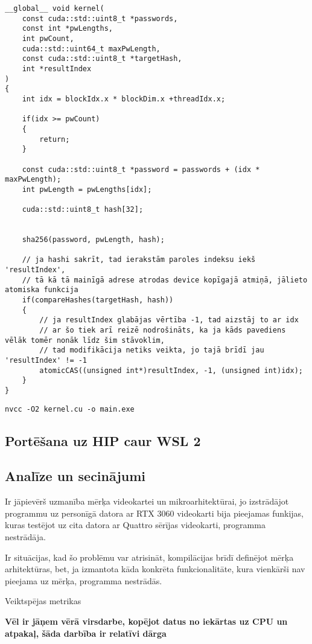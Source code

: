\documentclass[12pt]{report}%
\theoremstyle{definition}
\begin{document}
\begin{lstlisting}
__global__ void kernel(
    const cuda::std::uint8_t *passwords,
    const int *pwLengths,
    int pwCount,
    cuda::std::uint64_t maxPwLength,
    const cuda::std::uint8_t *targetHash,
    int *resultIndex
)
{
    int idx = blockIdx.x * blockDim.x +threadIdx.x;

    if(idx >= pwCount)
    {
        return;
    }

    const cuda::std::uint8_t *password = passwords + (idx * maxPwLength);
    int pwLength = pwLengths[idx];

    cuda::std::uint8_t hash[32];


    sha256(password, pwLength, hash);

    // ja hashi sakrīt, tad ierakstām paroles indeksu iekš 'resultIndex',
    // tā kā tā mainīgā adrese atrodas device kopīgajā atmiņā, jālieto atomiska funkcija
    if(compareHashes(targetHash, hash))
    {
        // ja resultIndex glabājas vērtība -1, tad aizstāj to ar idx
        // ar šo tiek arī reizē nodrošināts, ka ja kāds pavediens vēlāk tomēr nonāk līdz šim stāvoklim,
        // tad modifikācija netiks veikta, jo tajā brīdī jau 'resultIndex' != -1
        atomicCAS((unsigned int*)resultIndex, -1, (unsigned int)idx);
    }
}
\end{lstlisting}


\texttt{nvcc -O2 kernel.cu -o main.exe}

\subsection{Portēšana uz HIP caur WSL 2}

\subsection{Analīze un secinājumi}

Ir jāpievērš uzmanība mērķa videokartei un mikroarhitektūrai, jo izstrādājot programmu uz personīgā datora 
ar RTX 3060 videokarti bija pieejamas funkijas, kuras testējot uz cita datora ar Quattro sērījas videokarti,
programma nestrādāja.

Ir situācijas, kad šo problēmu var atrisināt, kompilācijas brīdī definējot mērķa arhitektūras, bet,
ja izmantota kāda konkrēta funkcionalitāte, kura vienkārši nav pieejama uz mērķa, programma nestrādās.


Veiktspējas metrikas

\textbf{Vēl ir jāņem vērā virsdarbe, kopējot datus no iekārtas uz CPU un atpakaļ, šāda darbība ir relatīvi dārga}
\end{document}

